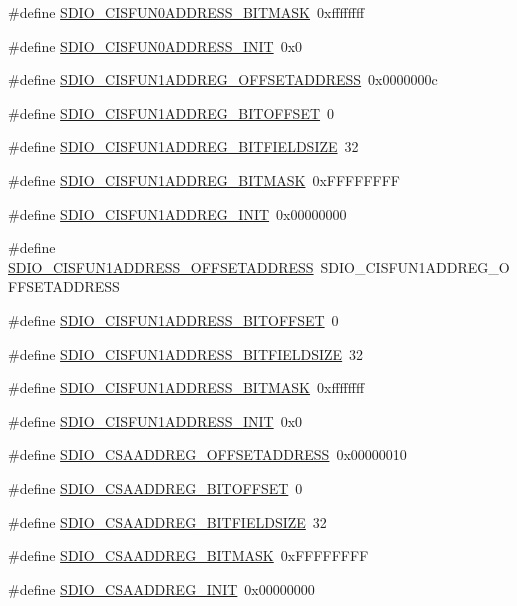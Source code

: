 \begin{DoxyCompactItemize}
\item 
\#define \hyperlink{a00571_a79be08768dccf5e7e0662e62f1ff0824}{SDIO\_\-CISFUN0ADDRESS\_\-BITMASK}~0xffffffff
\item 
\#define \hyperlink{a00571_a3b104680873a615f3f9e5d4208001f03}{SDIO\_\-CISFUN0ADDRESS\_\-INIT}~0x0
\item 
\#define \hyperlink{a00571_afc1112b12942bdb1ddb9ff47d1b2a3e9}{SDIO\_\-CISFUN1ADDREG\_\-OFFSETADDRESS}~0x0000000c
\item 
\#define \hyperlink{a00571_aa90b63cc3e70e2d3e0532fed438b95e4}{SDIO\_\-CISFUN1ADDREG\_\-BITOFFSET}~0
\item 
\#define \hyperlink{a00571_a6f415599ebf4857f86412054823840ab}{SDIO\_\-CISFUN1ADDREG\_\-BITFIELDSIZE}~32
\item 
\#define \hyperlink{a00571_ac81cf4b51437b902ccb6758a48b50b2d}{SDIO\_\-CISFUN1ADDREG\_\-BITMASK}~0xFFFFFFFF
\item 
\#define \hyperlink{a00571_af119a5676558d78c85f34491675502d4}{SDIO\_\-CISFUN1ADDREG\_\-INIT}~0x00000000
\item 
\#define \hyperlink{a00571_a72e49877a79bedd18141cb5afebfbf6f}{SDIO\_\-CISFUN1ADDRESS\_\-OFFSETADDRESS}~SDIO\_\-CISFUN1ADDREG\_\-OFFSETADDRESS
\item 
\#define \hyperlink{a00571_adebae38e0fec037389a6ce75f100719e}{SDIO\_\-CISFUN1ADDRESS\_\-BITOFFSET}~0
\item 
\#define \hyperlink{a00571_ade0c54ede1934cfe26c40c43b17df618}{SDIO\_\-CISFUN1ADDRESS\_\-BITFIELDSIZE}~32
\item 
\#define \hyperlink{a00571_a44eee13aa10df7d1409a6b8f1c36030c}{SDIO\_\-CISFUN1ADDRESS\_\-BITMASK}~0xffffffff
\item 
\#define \hyperlink{a00571_a4bca3fdef27d7f23c3fd90754a4896fd}{SDIO\_\-CISFUN1ADDRESS\_\-INIT}~0x0
\item 
\#define \hyperlink{a00571_a8ba78d915908f8714e88e858da6deceb}{SDIO\_\-CSAADDREG\_\-OFFSETADDRESS}~0x00000010
\item 
\#define \hyperlink{a00571_a2d53bb1b864a861629bf2d922e51000f}{SDIO\_\-CSAADDREG\_\-BITOFFSET}~0
\item 
\#define \hyperlink{a00571_a0841e7182cd086394a140113a7c91443}{SDIO\_\-CSAADDREG\_\-BITFIELDSIZE}~32
\item 
\#define \hyperlink{a00571_a2e78bef11d906487c22e8cc046e31dea}{SDIO\_\-CSAADDREG\_\-BITMASK}~0xFFFFFFFF
\item 
\#define \hyperlink{a00571_ad4409bd49d9981f1af05930dae31c8d1}{SDIO\_\-CSAADDREG\_\-INIT}~0x00000000
\item 

\end{DoxyCompactItemize}
